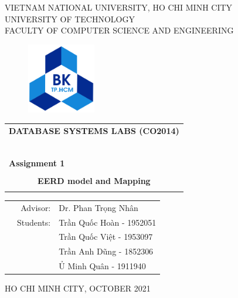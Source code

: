 \documentclass[a4paper]{article}
\begin{document}
\begin{titlepage}
\begin{center}
VIETNAM NATIONAL UNIVERSITY, HO CHI MINH CITY \\
UNIVERSITY OF TECHNOLOGY \\
FACULTY OF COMPUTER SCIENCE AND ENGINEERING
\end{center}

\vspace{1cm}

\begin{figure}[h!]
\begin{center}
\includegraphics[width=3cm]{hcmut.png}
\end{center}
\end{figure}

\vspace{1cm}


\begin{center}
\begin{tabular}{c}
\multicolumn{1}{l}{\textbf{{\Large DATABASE SYSTEMS LABS (CO2014)}}}\\
~~\\
\hline
\\
\multicolumn{1}{l}{\textbf{{\Large Assignment 1}}}\\
\\
\textbf{{\Huge EERD model and Mapping}}\\
\\
\hline
\end{tabular}
\end{center}

\vspace{3cm}

\begin{table}[h]
\begin{tabular}{rrl}
\hspace{5 cm} & Advisor: & Dr. Phan Trọng Nhân\\
& Students: & Trần Quốc Hoàn - 1952051 \\
& & Trần Quốc Việt - 1953097 \\
& & Trần Anh Dũng - 1852306 \\
& & Ủ Minh Quân - 1911940 \\
\end{tabular}
\end{table}

\begin{center}
{\footnotesize HO CHI MINH CITY, OCTOBER 2021}
\end{center}
\end{titlepage}
\end{document}
